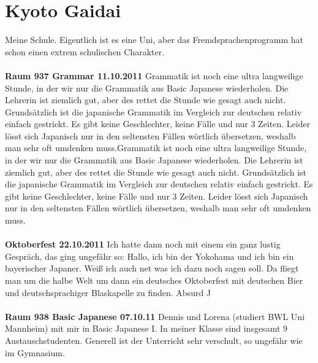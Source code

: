 \documentclass{article}
\begin{document}
\section{Kyoto Gaidai}
	
	Meine Schule. Eigentlich ist es eine Uni, aber das Fremdsprachenprogramm hat schon einen extrem schulischen Charakter.
%
	\paragraph{}
	\doublespacing
	\textbf{Raum 937 Grammar 11.10.2011}
	\singlespacing
	Grammatik ist noch eine ultra langweilige Stunde, in der wir nur die Grammatik aus Basic Japanese wiederholen. Die Lehrerin ist ziemlich gut, aber des rettet die Stunde wie gesagt auch nicht. Grundsätzlich ist die japanische Grammatik im Vergleich zur deutschen relativ einfach gestrickt. Es gibt keine Geschlechter, keine Fälle und nur 3 Zeiten. Leider lösst sich Japanisch nur in den seltensten Fällen wörtlich übersetzen, weshalb man sehr oft umdenken muss.Grammatik ist noch eine ultra langweilige Stunde, in der wir nur die Grammatik aus Basic Japanese wiederholen. Die Lehrerin ist ziemlich gut, aber des rettet die Stunde wie gesagt auch nicht. Grundsätzlich ist die japanische Grammatik im Vergleich zur deutschen relativ einfach gestrickt. Es gibt keine Geschlechter, keine Fälle und nur 3 Zeiten. Leider lösst sich Japanisch nur in den seltensten Fällen wörtlich übersetzen, weshalb man sehr oft umdenken muss.
%	
	\paragraph{}
	\doublespacing
	\textbf{Oktoberfest 22.10.2011}
	\singlespacing
	Ich hatte dann noch mit einem ein ganz lustig Gespräch, das ging ungefähr so: Hallo, ich bin der Yokohama und ich bin ein bayerischer Japaner. Weiß ich auch net was ich dazu noch sagen soll. Da fliegt man um die halbe Welt um dann ein deutsches Oktoberfest mit deutschen Bier und deutschsprachiger Blaskapelle zu finden. Absurd ^^
%
	\paragraph{}
	\doublespacing
	\textbf{Raum 938 Basic Japanese 07.10.11}
	\singlespacing
	Dennis und Lorena (studiert BWL Uni Mannheim) mit mir in Basic Japanese I. In meiner Klasse sind insgesamt 9 Austauschstudenten. Generell ist der Unterricht sehr verschult, so ungefähr wie im Gymnasium.
	\picskip{0}
%
\end{document}
